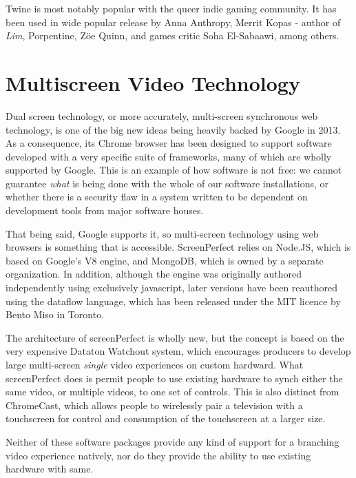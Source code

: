 Twine is most notably popular with the queer indie gaming community. It has been used in wide popular release by Anna Anthropy, Merrit Kopas - author of \textit{Lim}, Porpentine, Zöe Quinn, and games critic Soha El-Sabaawi, among others. 



\section{Multiscreen Video Technology}
Dual screen technology, or more accurately, multi-screen synchronous web technology, is one of the big new ideas being heavily backed by Google in 2013. As a consequence, its Chrome browser has been designed to support software developed with a very specific suite of frameworks, many of which are wholly supported by Google. This is an example of how software is not free: we cannot guarantee \textit{what} is being done with the whole of our software installations, or whether there is a security flaw in a system written to be dependent on development tools from major software houses. 

That being said, Google supports it, so multi-screen technology using web browsers is something that is accessible. ScreenPerfect relies on Node.JS, which is based on Google's V8 engine, and MongoDB, which is owned by a separate organization. In addition, although the engine was originally authored independently using exclusively javascript, later versions have been reauthored using the \cite{daimio} dataflow language, which has been released under the MIT licence by Bento Miso in Toronto.

The architecture of screenPerfect is wholly new, but the concept is based on the very expensive Dataton Watchout system, which encourages producers to develop large multi-screen \textit{single} video experiences on custom hardward. What screenPerfect does is permit people to use existing hardware to synch either the same video, or multiple videos, to one set of controls. This is also distinct from ChromeCast, which allows people to wirelessly pair a television with a touchscreen for control and consumption of the touchscreen at a larger size. 

Neither of these software packages provide any kind of support for a branching video experience natively, nor do they provide the ability to use existing hardware with same.



